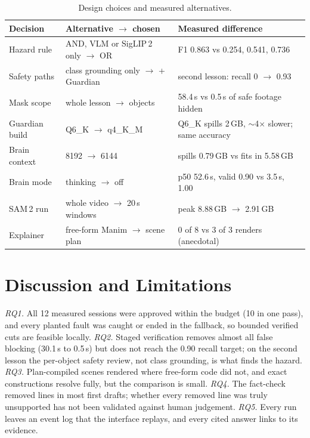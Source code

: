 \documentclass[conference,a4paper]{IEEEtran}
\begin{document}
\begin{table}[t]
\centering
\caption{Design choices and measured alternatives.}
\label{tab:alts}
\footnotesize
\begin{tabular}{@{}L{1.3cm}L{2.45cm}L{3.8cm}@{}}
\toprule
Decision & Alternative $\rightarrow$ chosen & Measured difference\\
\midrule
Hazard rule & AND, VLM or SigLIP\,2 only $\rightarrow$ OR & F1 0.863 vs 0.254, 0.541, 0.736\\
Safety paths & class grounding only $\rightarrow$ + Guardian & second lesson: recall 0 $\rightarrow$ 0.93\\
Mask scope & whole lesson $\rightarrow$ objects & 58.4\,s vs 0.5\,s of safe footage hidden\\
Guardian build & Q6\_K $\rightarrow$ q4\_K\_M & Q6\_K spills 2\,GB, $\sim$4$\times$ slower; same accuracy\\
Brain context & 8192 $\rightarrow$ 6144 & spills 0.79\,GB vs fits in 5.58\,GB\\
Brain mode & thinking $\rightarrow$ off & p50 52.6\,s, valid 0.90 vs 3.5\,s, 1.00\\
SAM\,2 run & whole video $\rightarrow$ 20\,s windows & peak 8.88\,GB $\rightarrow$ 2.91\,GB\\
Explainer & free-form Manim $\rightarrow$ scene plan & 0 of 8 vs 3 of 3 renders (anecdotal)\\
\bottomrule
\end{tabular}
\end{table}

\section{Discussion and Limitations}
\emph{RQ1.} All 12 measured sessions were approved within the budget (10 in one pass), and every planted fault was
caught or ended in the fallback, so bounded verified cuts are feasible locally. \emph{RQ2.} Staged verification removes
almost all false blocking (30.1\,s to 0.5\,s) but does not reach the 0.90 recall target; on the second lesson the
per-object safety review, not class grounding, is what finds the hazard. \emph{RQ3.} Plan-compiled scenes rendered
where free-form code did not, and exact constructions resolve fully, but the comparison is small. \emph{RQ4.} The
fact-check removed lines in most first drafts; whether every removed line was truly unsupported has not been validated
against human judgement. \emph{RQ5.} Every run leaves an event log that the interface replays, and every cited answer
links to its evidence.
\end{document}
